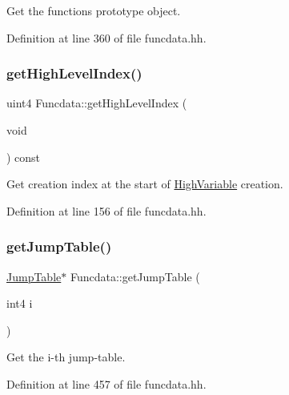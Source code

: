 Get the function\textquotesingle{}s prototype object. 



Definition at line 360 of file funcdata.\+hh.

\mbox{\label{class_funcdata_a336622e6dcb32a1539d3d98c4115ead8}} 
\subsubsection{\texorpdfstring{getHighLevelIndex()}{getHighLevelIndex()}}
{\footnotesize\ttfamily uint4 Funcdata\+::get\+High\+Level\+Index (\begin{DoxyParamCaption}\item[{void}]{ }\end{DoxyParamCaption}) const\hspace{0.3cm}{\ttfamily [inline]}}



Get creation index at the start of \mbox{\hyperlink{class_high_variable}{High\+Variable}} creation. 



Definition at line 156 of file funcdata.\+hh.

\mbox{\label{class_funcdata_a475047d15d64d653871facd75f7244ed}} 
\subsubsection{\texorpdfstring{getJumpTable()}{getJumpTable()}}
{\footnotesize\ttfamily \mbox{\hyperlink{class_jump_table}{Jump\+Table}}$\ast$ Funcdata\+::get\+Jump\+Table (\begin{DoxyParamCaption}\item[{int4}]{i }\end{DoxyParamCaption})\hspace{0.3cm}{\ttfamily [inline]}}



Get the i-\/th jump-\/table. 



Definition at line 457 of file funcdata.\+hh.

